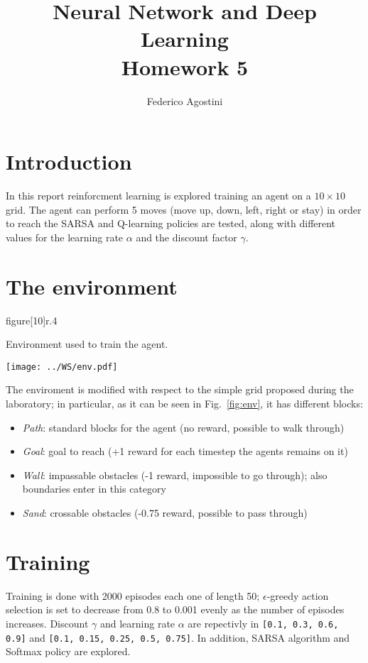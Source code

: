 \documentclass[a4paper,11pt]{article}
\title{Neural Network and Deep Learning \\ Homework 5}
\author{Federico Agostini}
\date{}
\begin{document}
\maketitle

\section{Introduction}
In this report reinforcment learning is explored training an agent on a $10 \times 10$ grid. The agent can perform 5 moves (move up, down, left, right or stay) in order to reach the SARSA and Q-learning policies are tested, along with different values for the learning rate $\alpha$ and the discount factor $\gamma$.

\section{The environment}

\begin{wrapfloat}{figure}[10]{r}{.4\textwidth}
  \caption{Environment used to train the agent.}
  \label{fig:env}
  \texttt{[image: ../WS/env.pdf]}
\end{wrapfloat}

The enviroment is modified with respect to the simple grid proposed during the laboratory; in particular, as it can be seen in Fig.~\ref{fig:env}, it has different blocks:
\begin{itemize}
  \item \emph{Path}: standard blocks for the agent (no reward, possible to walk through)
  \item \emph{Goal}: goal to reach (+1 reward for each timestep the agents remains on it)
  \item \emph{Wall}: impassable obstacles (-1 reward, impossible to go through); also boundaries enter in this category
  \item \emph{Sand}: crossable obstacles (-0.75 reward, possible to pass through)
\end{itemize}

\section{Training}
Training is done with 2000 episodes each one of length 50; $\epsilon$-greedy action selection is set to decrease from 0.8 to 0.001 evenly as the number of episodes increases. Discount $\gamma$ and learning rate $\alpha$ are repectivly in \texttt{[0.1, 0.3, 0.6, 0.9]} and \texttt{[0.1, 0.15, 0.25, 0.5, 0.75]}. In addition, SARSA algorithm and Softmax policy are explored.
\end{document}
